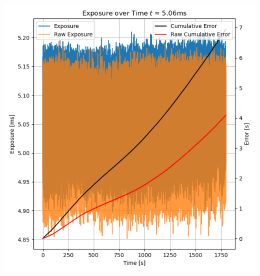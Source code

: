 \noindent\begin{minipage}[t]{\dimexpr.994\linewidth/3}\vspace{0pt}
    \begin{centering}
        \includegraphics[width=\linewidth]{../results/59-99fps-4999us-at-60-299084fps-exposure-both}
        \vspace{-2.0em}
        \label{img:exposure-ot}
    \end{centering}
\end{minipage}

